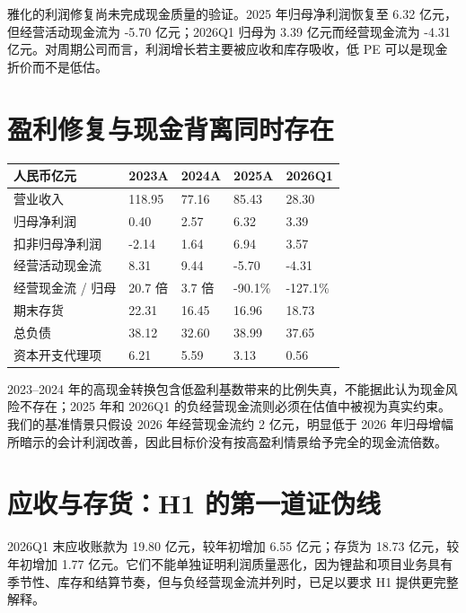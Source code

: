 雅化的利润修复尚未完成现金质量的验证。2025 年归母净利润恢复至 6.32 亿元，但经营活动现金流为 -5.70 亿元；2026Q1 归母为 3.39 亿元而经营现金流为 -4.31 亿元。对周期公司而言，利润增长若主要被应收和库存吸收，低 PE 可以是现金折价而不是低估。

\section{盈利修复与现金背离同时存在}

\begin{exhibitbox}[表 5-1：历史财务与现金转换]
\begin{tabularx}{\exhibitboxwidth}{L{3.4cm}R{2.0cm}R{2.0cm}R{2.0cm}R{2.0cm}}
\toprule
人民币亿元 & 2023A & 2024A & 2025A & 2026Q1 \\
\midrule
营业收入 & 118.95 & 77.16 & 85.43 & 28.30 \\
归母净利润 & 0.40 & 2.57 & 6.32 & 3.39 \\
扣非归母净利润 & -2.14 & 1.64 & 6.94 & 3.57 \\
经营活动现金流 & 8.31 & 9.44 & -5.70 & -4.31 \\
经营现金流 / 归母 & 20.7 倍 & 3.7 倍 & -90.1\% & -127.1\% \\
期末存货 & 22.31 & 16.45 & 16.96 & 18.73 \\
总负债 & 38.12 & 32.60 & 38.99 & 37.65 \\
资本开支代理项 & 6.21 & 5.59 & 3.13 & 0.56 \\
\bottomrule
\end{tabularx}
\end{exhibitbox}

2023--2024 年的高现金转换包含低盈利基数带来的比例失真，不能据此认为现金风险不存在；2025 年和 2026Q1 的负经营现金流则必须在估值中被视为真实约束。我们的基准情景只假设 2026 年经营现金流约 2 亿元，明显低于 2026 年归母增幅所暗示的会计利润改善，因此目标价没有按高盈利情景给予完全的现金流倍数。

\section{应收与存货：H1 的第一道证伪线}

2026Q1 末应收账款为 19.80 亿元，较年初增加 6.55 亿元；存货为 18.73 亿元，较年初增加 1.77 亿元。它们不能单独证明利润质量恶化，因为锂盐和项目业务具有季节性、库存和结算节奏，但与负经营现金流并列时，已足以要求 H1 提供更完整解释。

